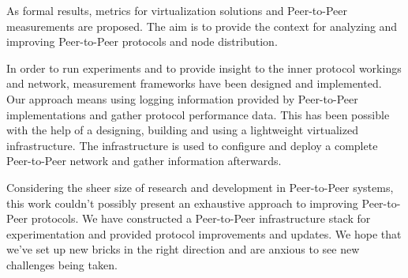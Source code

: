 As formal results, metrics for virtualization solutions and Peer-to-Peer
measurements are proposed. The aim is to provide the context for analyzing and
improving Peer-to-Peer protocols and node distribution.

In order to run experiments and to provide insight to the inner protocol
workings and network, measurement frameworks have been designed and
implemented. Our approach means using logging information provided by
Peer-to-Peer implementations and gather protocol performance data. This has
been possible with the help of a designing, building and using a lightweight
virtualized infrastructure. The infrastructure is used to configure and deploy
a complete Peer-to-Peer network and gather information afterwards.

Considering the sheer size of research and development in Peer-to-Peer
systems, this work couldn't possibly present an exhaustive approach to
improving Peer-to-Peer protocols. We have constructed a Peer-to-Peer
infrastructure stack for experimentation and provided protocol improvements
and updates. We hope that we've set up new bricks in the right direction and
are anxious to see new challenges being taken.

